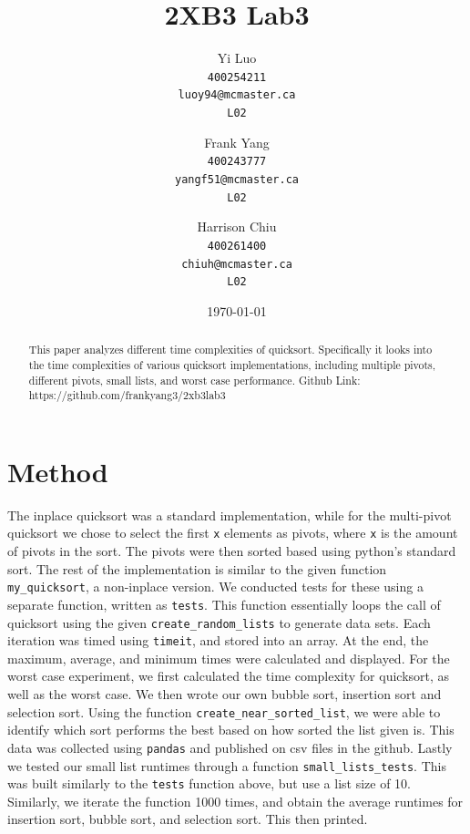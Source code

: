 \documentclass{article}
\title{2XB3 Lab3}
\author{
  Yi Luo\\
  \texttt{400254211}\\
  \texttt{luoy94@mcmaster.ca}\\
  \texttt{L02}
  \and
  Frank Yang\\
  \texttt{400243777}\\
  \texttt{yangf51@mcmaster.ca}\\
  \texttt{L02}
  \and
  Harrison Chiu\\
  \texttt{400261400}\\
  \texttt{chiuh@mcmaster.ca}\\
  \texttt{L02}
}
\date{\today}
\begin{document}
\maketitle

\begin{abstract}
This paper analyzes different time complexities of quicksort. Specifically it looks into the time complexities of various quicksort implementations, including multiple pivots, different pivots, small lists, and worst case performance. Github Link: https://github.com/frankyang3/2xb3lab3
\end{abstract}

\pagebreak 
\section*{Method}
 The inplace quicksort was a standard implementation, while for the multi-pivot quicksort we chose to select the first \verb|x| elements as pivots, where \verb|x| is the amount of pivots in the sort. The pivots were then sorted based using python's standard sort. The rest of the implementation is similar to the given function \verb|my_quicksort|, a non-inplace version. We conducted tests for these using a separate function, written as \verb|tests|. This function essentially loops the call of quicksort using the given \verb|create_random_lists| to generate data sets. Each iteration was timed using \verb|timeit|, and stored into an array. At the end, the maximum, average, and minimum times were calculated and displayed. For the worst case experiment, we first calculated the time complexity for quicksort, as well as the worst case. We then wrote our own bubble sort, insertion sort and selection sort. Using the function \verb|create_near_sorted_list|, we were able to identify which sort performs the best based on how sorted the list given is. This data was collected using \verb|pandas| and published on csv files in the github. Lastly we tested our small list runtimes through a function \verb|small_lists_tests|. This was built similarly to the \verb|tests| function above, but use a list size of 10. Similarly, we iterate the function 1000 times, and obtain the average runtimes for insertion sort, bubble sort, and selection sort. This then printed.
\end{document}
